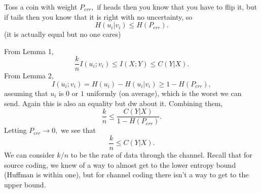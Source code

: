 \documentclass[12pt]{article}
\begin{document}
Toss a coin with weight $P_{err},$ if heads then you know that you have to flip it, but if tails then you know that it is right with no uncertainty, so
\[H(u_i|v_i)\le H(P_{err}).\]
(it is actually equal but no one cares)

From Lemma 1,
\[\frac{k}{n}I(u_i;v_i)\le I(X;Y)\le C(Y|X).\]
From Lemma 2,
\[I(u_i;v_i)=H(u_i)-H(u_i|v_i)\ge 1-H(P_{err}),\]
assuming that $u_i$ is $0$ or $1$ uniformly (on average), which is the worst we can send. Again this is also an equality but dw about it.
Combining them,
\[\frac{k}{n}\le \frac{C(Y|X)}{1-H(P_{err})}.\] Letting $P_{err}\to 0,$ we see that
\[\frac{k}{n}\le C(Y|X).\]
We can consider $k/n$ to be the rate of data through the channel. Recall that for source coding, we knew of a way to almost get to the lower entropy bound (Huffman is within one), but for channel coding there isn't a way to get to the upper bound.
\end{document}
